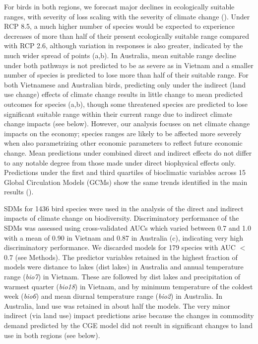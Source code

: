 For birds in both regions, we forecast major declines in ecologically suitable ranges, with severity of loss scaling with the severity of climate change (). Under RCP 8.5, a much higher number of species would be expected to experience decreases of more than half of their present ecologically suitable range compared with RCP 2.6, although variation in responses is also greater, indicated by the much wider spread of points (a,b). In Australia, mean suitable range decline under both pathways is not predicted to be as severe as in Vietnam and a smaller number of species is predicted to lose more than half of their suitable range. For both Vietnamese and Australian birds, predicting only under the indirect (land use change) effects of climate change results in little change to mean predicted outcomes for species (a,b), though some threatened species are predicted to lose significant suitable range within their current range due to indirect climate change impacts (see below). However, our analysis focuses on net climate change impacts on the economy; species ranges are likely to be affected more severely when also parametrizing other economic parameters to reflect future economic change. Mean predictions under combined direct and indirect effects do not differ to any notable degree from those made under direct biophysical effects only. Predictions under the first and third quartiles of bioclimatic variables across 15 Global Circulation Models (GCMs) show the same trends identified in the main results ().

SDMs for 1436 bird species were used in the analysis of the direct and indirect impacts of climate change on biodiversity. Discriminatory performance of the SDMs was assessed using cross-validated AUCs which varied between 0.7 and 1.0 with a mean of 0.90 in Vietnam and 0.87 in Australia (c), indicating very high discriminatory performance. We discarded models for 179 species with AUC $<$ 0.7 (see Methods). The predictor variables retained in the highest fraction of models were distance to lakes (dist lakes) in Australia and annual temperature range (\textit{bio7}) in Vietnam. These are followed by dist lakes and precipitation of warmest quarter (\textit{bio18}) in Vietnam, and by minimum temperature of the coldest week (\textit{bio6}) and mean diurnal temperature range (\textit{bio2}) in Australia. In Australia, land use was retained in about half the models. The very minor indirect (via land use) impact predictions arise because the changes in commodity demand predicted by the CGE model did not result in significant changes to land use in both regions (see below).

